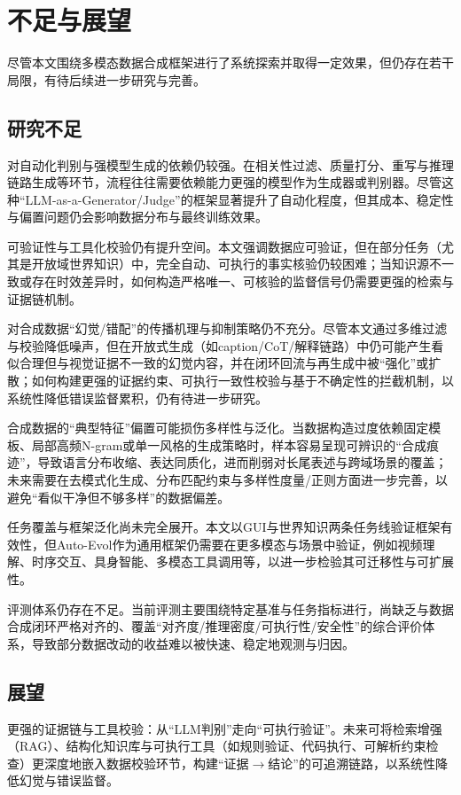 \section{不足与展望}
尽管本文围绕多模态数据合成框架进行了系统探索并取得一定效果，但仍存在若干局限，有待后续进一步研究与完善。

\subsection{研究不足}

对自动化判别与强模型生成的依赖仍较强。在相关性过滤、质量打分、重写与推理链路生成等环节，流程往往需要依赖能力更强的模型作为生成器或判别器。尽管这种“LLM-as-a-Generator/\allowbreak Judge”的框架显著提升了自动化程度，但其成本、稳定性与偏置问题仍会影响数据分布与最终训练效果。

可验证性与工具化校验仍有提升空间。本文强调数据应可验证，但在部分任务（尤其是开放域世界知识）中，完全自动、可执行的事实核验仍较困难；当知识源不一致或存在时效差异时，如何构造严格唯一、可核验的监督信号仍需要更强的检索与证据链机制。

对合成数据“幻觉/错配”的传播机理与抑制策略仍不充分。尽管本文通过多维过滤与校验降低噪声，但在开放式生成（如caption/CoT/解释链路）中仍可能产生看似合理但与视觉证据不一致的幻觉内容，并在闭环回流与再生成中被“强化”或扩散；如何构建更强的证据约束、可执行一致性校验与基于不确定性的拦截机制，以系统性降低错误监督累积，仍有待进一步研究。

合成数据的“典型特征”偏置可能损伤多样性与泛化。当数据构造过度依赖固定模板、局部高频N-gram或单一风格的生成策略时，样本容易呈现可辨识的“合成痕迹”，导致语言分布收缩、表达同质化，进而削弱对长尾表述与跨域场景的覆盖；未来需要在去模式化生成、分布匹配约束与多样性度量/正则方面进一步完善，以避免“看似干净但不够多样”的数据偏差。

任务覆盖与框架泛化尚未完全展开。本文以GUI与世界知识两条任务线验证框架有效性，但Auto-Evol作为通用框架仍需要在更多模态与场景中验证，例如视频理解、时序交互、具身智能、多模态工具调用等，以进一步检验其可迁移性与可扩展性。

评测体系仍存在不足。当前评测主要围绕特定基准与任务指标进行，尚缺乏与数据合成闭环严格对齐的、覆盖“对齐度/推理密度/可执行性/安全性”的综合评价体系，导致部分数据改动的收益难以被快速、稳定地观测与归因。


\subsection{展望}

更强的证据链与工具校验：从“LLM判别”走向“可执行验证”。未来可将检索增强（RAG）、结构化知识库与可执行工具（如规则验证、代码执行、可解析约束检查）更深度地嵌入数据校验环节，构建“证据$\rightarrow$结论”的可追溯链路，以系统性降低幻觉与错误监督。

